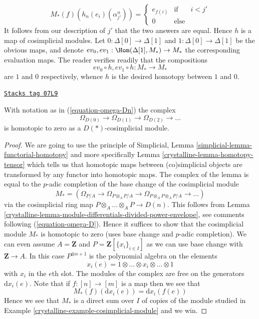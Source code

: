 \begin{example}
$$M_*(f)(h_n(e_i)(\alpha^n_{j'})) =
\left\{
\begin{matrix}
e_{f(i)} & \text{if} & i < j' \\
0 & \text{else}
\end{matrix}
\right.
$$
It follows from our description of $j'$ that the two answers are equal.
Hence $h$ is a map of cosimplicial modules.
Let $0 : \Delta[0] \to \Delta[1]$ and
$1 : \Delta[0] \to \Delta[1]$ be the obvious maps, and denote
$ev_0, ev_1 : \Hom(\Delta[1], M_*) \to M_*$ the corresponding
evaluation maps. The reader verifies readily that
the compositions
$$
ev_0 \circ h, ev_1 \circ h : M_* \longrightarrow M_*
$$
are $1$ and $0$ respectively, whence $h$ is the desired homotopy between
$1$ and $0$.
\end{example}

\begin{lemma}
\label{crystalline-lemma-vanishing-omega-1}
\href{https://stacks.math.columbia.edu/tag/07L9}{\texttt{Stacks tag 07L9}}

With notation as in (\ref{equation-omega-Dn}) the complex
$$
\Omega_{D(0)} \to \Omega_{D(1)} \to \Omega_{D(2)} \to \ldots
$$
is homotopic to zero as a $D(*)$-cosimplicial module.
\end{lemma}

\begin{proof}

We are going to use the principle of
Simplicial, Lemma \ref{simplicial-lemma-functorial-homotopy}
and more specifically
Lemma \ref{crystalline-lemma-homotopy-tensor}
which tells us that homotopic maps between (co)simplicial objects
are transformed by any functor into homotopic maps.
The complex of the lemma is equal to the $p$-adic completion of the
base change of the cosimplicial module
$$
M_* = \left(
\Omega_{P/A} \to
\Omega_{P \otimes_A P/A} \to
\Omega_{P \otimes_A P \otimes_A P/A} \to \ldots
\right)
$$
via the cosimplicial ring map $P\otimes_A \ldots \otimes_A P \to D(n)$. This
follows from Lemma \ref{crystalline-lemma-module-differentials-divided-power-envelope},
see comments following (\ref{equation-omega-D}). Hence it
suffices to show that the cosimplicial module $M_*$ is homotopic to zero
(uses base change and $p$-adic completion).
We can even assume $A = \mathbf{Z}$ and $P = \mathbf{Z}[\{x_i\}_{i \in I}]$
as we can use base change with $\mathbf{Z} \to A$.
In this case $P^{\otimes n + 1}$ is the polynomial algebra on the elements
$$
x_i(e) = 1 \otimes \ldots \otimes x_i \otimes \ldots \otimes 1
$$
with $x_i$ in the $e$th slot. The modules of the complex are free on the
generators $\text{d}x_i(e)$. Note that if $f : [n] \to [m]$ is a
map then we see that
$$
M_*(f)(\text{d}x_i(e)) = \text{d}x_i(f(e))
$$
Hence we see that $M_*$ is a direct sum over $I$ of copies of the module
studied in Example \ref{crystalline-example-cosimplicial-module} and we win.
\end{proof}

